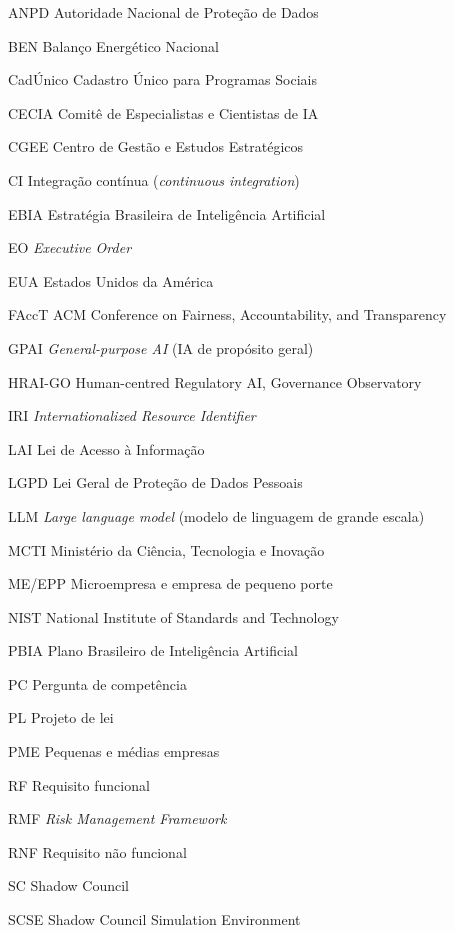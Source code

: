 \documentclass[12pt,a4paper,oneside,english,brazil]{abntex2}
\begin{document}
\begin{siglas}
  \item[ANPD] Autoridade Nacional de Proteção de Dados
  \item[BEN] Balanço Energético Nacional
  \item[CadÚnico] Cadastro Único para Programas Sociais
  \item[CECIA] Comitê de Especialistas e Cientistas de IA
  \item[CGEE] Centro de Gestão e Estudos Estratégicos
  \item[CI] Integração contínua (\emph{continuous integration})
  \item[EBIA] Estratégia Brasileira de Inteligência Artificial
  \item[EO] \emph{Executive Order}
  \item[EUA] Estados Unidos da América
  \item[FAccT] ACM Conference on Fairness, Accountability, and Transparency
  \item[GPAI] \emph{General-purpose AI} (IA de propósito geral)
  \item[HRAI-GO] Human-centred Regulatory AI, Governance Observatory
  \item[IRI] \emph{Internationalized Resource Identifier}
  \item[LAI] Lei de Acesso à Informação
  \item[LGPD] Lei Geral de Proteção de Dados Pessoais
  \item[LLM] \emph{Large language model} (modelo de linguagem de grande escala)
  \item[MCTI] Ministério da Ciência, Tecnologia e Inovação
  \item[ME/EPP] Microempresa e empresa de pequeno porte
  \item[NIST] National Institute of Standards and Technology
  \item[PBIA] Plano Brasileiro de Inteligência Artificial
  \item[PC] Pergunta de competência
  \item[PL] Projeto de lei
  \item[PME] Pequenas e médias empresas
  \item[RF] Requisito funcional
  \item[RMF] \emph{Risk Management Framework}
  \item[RNF] Requisito não funcional
  \item[SC] Shadow Council
  \item[SCSE] Shadow Council Simulation Environment

\end{siglas}
\end{document}

